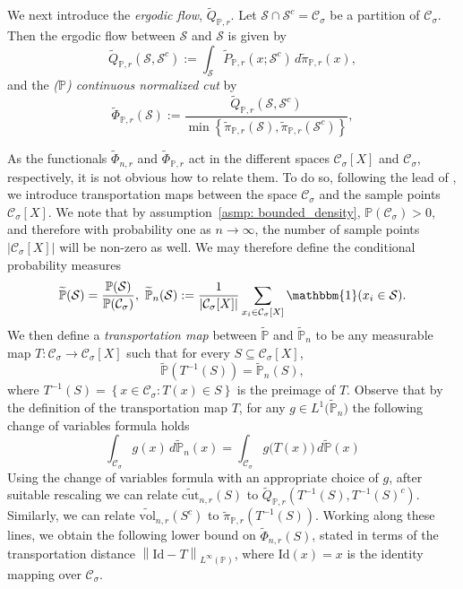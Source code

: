 \documentclass[11pt,twoside]{article}
\newcommand{\set}[1]{\left\{#1\right\}}
\newcommand{\vol}{\mathrm{vol}}
\newcommand{\cut}{\mathrm{cut}}
\newcommand{\abs}[1]{\left \lvert #1 \right \rvert}
\newcommand{\norm}[1]{\left\lVert#1\right\rVert}
\newcommand{\1}{\mathbbm{1}}
\newcommand{\Xbf}{X}
\newcommand{\Pbb}{\mathbb{P}}
\newcommand{\Sset}{\mathcal{S}}
\newcommand{\Cset}{\mathcal{C}}
\newcommand{\Csig}{\Cset_{\sigma}}
\newcommand{\piwt}{\widetilde{\pi}}
\begin{document}
We next introduce the \emph{ergodic flow}, $\widetilde{Q}_{\Pbb,r}$. Let $\Sset \cap \Sset^c = \Csig$ be a partition of $\Csig$. Then the ergodic flow between $\Sset$ and $\Sset$ is given by 
\begin{equation*}
\widetilde{Q}_{\Pbb,r}(\Sset, \Sset^c) := \int_{\Sset} \widetilde{P}_{\Pbb,r}(x; \Sset^c) \,d\piwt_{\Pbb,r}(x), 
\end{equation*}
and the \emph{($\Pbb$) continuous normalized cut} by
\begin{equation*}
\widetilde{\Phi}_{\Pbb,r}(\Sset) := \frac{\widetilde{Q}_{\Pbb,r}(\Sset, \Sset^c)}{\min \set{\piwt_{\Pbb,r}(\Sset),\piwt_{\Pbb,r}(\Sset^c)}},
\end{equation*}

As the functionals $\widetilde{\Phi}_{n,r}$ and $\widetilde{\Phi}_{\Pbb,r}$ act in the different spaces $\Csig[\Xbf]$ and $\Csig$, respectively, it is not obvious how to relate them. To do so, following the lead of \cite{garciatrillos16}, we introduce transportation maps between the space $\Csig$ and the sample points $\Csig[\Xbf]$. We note that by assumption~\ref{asmp: bounded_density}, $\Pbb(\Csig) > 0$, and therefore with probability one as $n \to \infty$, the number of sample points $\abs{\Csig[\Xbf]}$ will be non-zero as well. We may therefore define the conditional probability measures
\begin{equation*}
\widetilde{\Pbb}(\Sset) = \frac{\Pbb(\Sset)}{\Pbb(\Csig)}, ~ \widetilde{\Pbb}_{n}(\Sset) := \frac{1}{\abs{\Csig[\Xbf]}} \sum_{x_i \in \Csig[\Xbf]} \1(x_i \in \Sset).
\end{equation*} 
We then define a \emph{transportation map} between $\widetilde{\Pbb}$ and $\widetilde{\Pbb}_n$ to be any measurable map $T: \Csig \to \Csig[\Xbf]$ such that for every $S \subseteq \Csig[\Xbf]$,
\begin{equation*}
\widetilde{\Pbb}(T^{-1}(S)) = \widetilde{\Pbb}_n(S),
\end{equation*}
where $T^{-1}(S) = \set{x \in \Csig: T(x) \in S}$ is the preimage of $T$. Observe that by the definition of the transportation map $T$, for any $g \in L^1\bigl(\widetilde{\Pbb}_n\bigr)$ the following change of variables formula holds
\begin{equation*}
\int_{\Csig} g(x) \,d\widetilde{\Pbb}_{n}(x) = \int_{\Csig} g\bigl(T(x)\bigr) \,d\widetilde{\Pbb}(x)
\end{equation*}
Using the change of variables formula with an appropriate choice of $g$, after suitable rescaling we can relate $\widetilde{\cut}_{n,r}(S)$ to $\widetilde{Q}_{\Pbb,r}(T^{-1}(S), T^{-1}(S)^c)$. Similarly, we can relate $\widetilde{\vol}_{n,r}(S^c)$ to $\widetilde{\pi}_{\Pbb,r}(T^{-1}(S))$. Working along these lines, we obtain the following lower bound on $\widetilde{\Phi}_{n,r}(S)$, stated in terms of the transportation distance $\norm{\mathrm{Id} - T}_{L^{\infty}(\Pbb)}$, where $\mathrm{Id}(x) = x$ is the identity mapping over $\Csig$.
\end{document}

